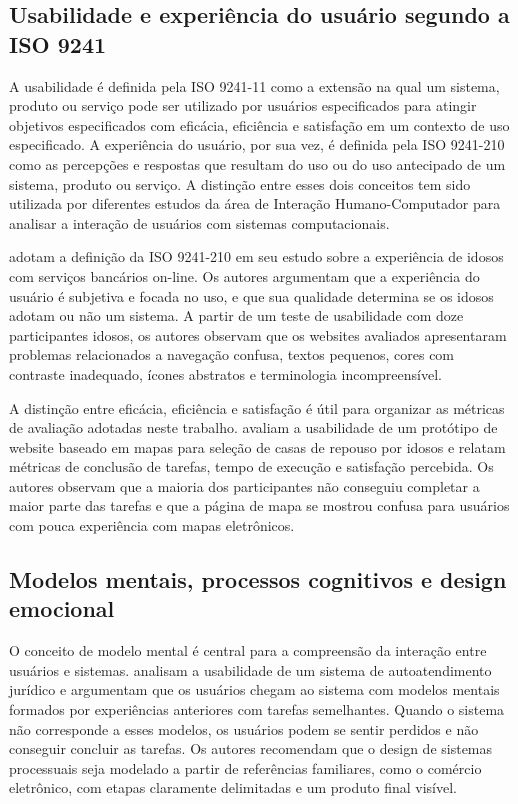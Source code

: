 \subsection{Usabilidade e experiência do usuário segundo a ISO 9241}

\label{sec:iso9241}

A usabilidade é definida pela ISO 9241-11 como a extensão na qual um sistema, produto ou serviço pode ser utilizado por usuários especificados para atingir objetivos especificados com eficácia, eficiência e satisfação em um contexto de uso especificado. A experiência do usuário, por sua vez, é definida pela ISO 9241-210 como as percepções e respostas que resultam do uso ou do uso antecipado de um sistema, produto ou serviço. A distinção entre esses dois conceitos tem sido utilizada por diferentes estudos da área de Interação Humano-Computador para analisar a interação de usuários com sistemas computacionais.

\cite{gatsou2017seniors} adotam a definição da ISO 9241-210 em seu estudo sobre a experiência de idosos com serviços bancários on-line. Os autores argumentam que a experiência do usuário é subjetiva e focada no uso, e que sua qualidade determina se os idosos adotam ou não um sistema. A partir de um teste de usabilidade com doze participantes idosos, os autores observam que os websites avaliados apresentaram problemas relacionados a navegação confusa, textos pequenos, cores com contraste inadequado, ícones abstratos e terminologia incompreensível.

A distinção entre eficácia, eficiência e satisfação é útil para organizar as métricas de avaliação adotadas neste trabalho. \cite{xie2010usability} avaliam a usabilidade de um protótipo de website baseado em mapas para seleção de casas de repouso por idosos e relatam métricas de conclusão de tarefas, tempo de execução e satisfação percebida. Os autores observam que a maioria dos participantes não conseguiu completar a maior parte das tarefas e que a página de mapa se mostrou confusa para usuários com pouca experiência com mapas eletrônicos.

\subsection{Modelos mentais, processos cognitivos e design emocional}

\label{sec:norman}

O conceito de modelo mental é central para a compreensão da interação entre usuários e sistemas. \cite{mastarone2007access} analisam a usabilidade de um sistema de autoatendimento jurídico e argumentam que os usuários chegam ao sistema com modelos mentais formados por experiências anteriores com tarefas semelhantes. Quando o sistema não corresponde a esses modelos, os usuários podem se sentir perdidos e não conseguir concluir as tarefas. Os autores recomendam que o design de sistemas processuais seja modelado a partir de referências familiares, como o comércio eletrônico, com etapas claramente delimitadas e um produto final visível.

